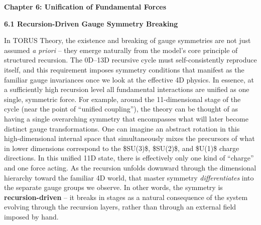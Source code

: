\documentclass[
]{article}
\author{}
\date{}
\begin{document}
\textbf{Chapter 6: Unification of Fundamental Forces}

\textbf{6.1 Recursion-Driven Gauge Symmetry Breaking}

In TORUS Theory, the existence and breaking of gauge symmetries are not
just assumed \emph{a priori} -- they emerge naturally from the model's
core principle of structured recursion\hspace{0pt}. The 0D--13D
recursive cycle must self-consistently reproduce itself, and this
requirement imposes symmetry conditions that manifest as the familiar
gauge invariances once we look at the effective 4D physics\hspace{0pt}.
In essence, at a sufficiently high recursion level all fundamental
interactions are unified as one single, symmetric force. For example,
around the 11-dimensional stage of the cycle (near the point of
``unified coupling''), the theory can be thought of as having a single
overarching symmetry that encompasses what will later become distinct
gauge transformations\hspace{0pt}. One can imagine an abstract rotation
in this high-dimensional internal space that simultaneously mixes the
precursors of what in lower dimensions correspond to the \$SU(3)\$,
\$SU(2)\$, and \$U(1)\$ charge directions\hspace{0pt}. In this unified
11D state, there is effectively only one kind of ``charge'' and one
force acting. As the recursion unfolds downward through the dimensional
hierarchy toward the familiar 4D world, that master symmetry
\emph{differentiates} into the separate gauge groups we
observe\hspace{0pt}. In other words, the symmetry is
\textbf{recursion-driven} -- it breaks in stages as a natural
consequence of the system evolving through the recursion layers, rather
than through an external field imposed by hand.
\end{document}
